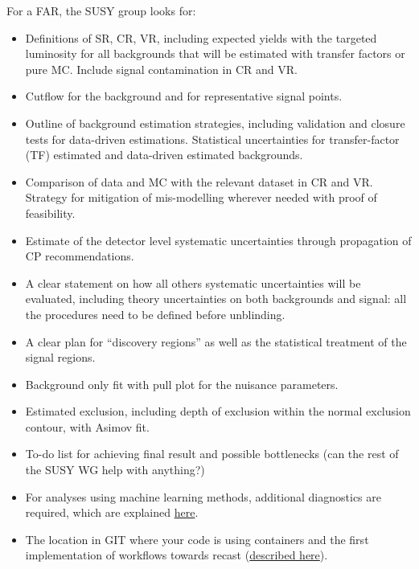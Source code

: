 For a FAR, the SUSY group looks for:
\begin{itemize}
\item Definitions of SR, CR, VR, including expected yields with the targeted luminosity for all backgrounds that will be estimated with transfer factors or pure MC.
    Include signal contamination in CR and VR.
\item Cutflow for the background and for representative signal points.
\item Outline of background estimation strategies, including validation and closure tests for data-driven estimations. Statistical uncertainties for transfer-factor (TF) estimated and data-driven estimated backgrounds.
\item Comparison of data and MC with the relevant dataset in CR and VR. Strategy for mitigation of mis-modelling wherever needed with proof of feasibility.
\item Estimate of the detector level systematic uncertainties through propagation of CP recommendations.
\item A clear statement on how all others systematic uncertainties will be evaluated, including theory uncertainties on both backgrounds and signal: all the procedures need to be defined before unblinding.
\item A clear plan for ``discovery regions'' as well as the statistical treatment of the signal regions.
\item Background only fit with pull plot for the nuisance parameters.
\item Estimated exclusion, including depth of exclusion within the normal exclusion contour, with Asimov fit.
\item To-do list for achieving final result and possible bottlenecks (can the rest of the SUSY WG help with anything?)
\item For analyses using machine learning methods, additional diagnostics are required, which are explained \href{https://twiki.cern.ch/twiki/bin/view/AtlasProtected/SusyMachineLearning}{here}.
\item The location in GIT where your code is using containers and the first implementation of workflows towards recast (\href{https://recast-docs.web.cern.ch/recast-docs/workflowauthoring/intro/}{described here}).
\end{itemize}

